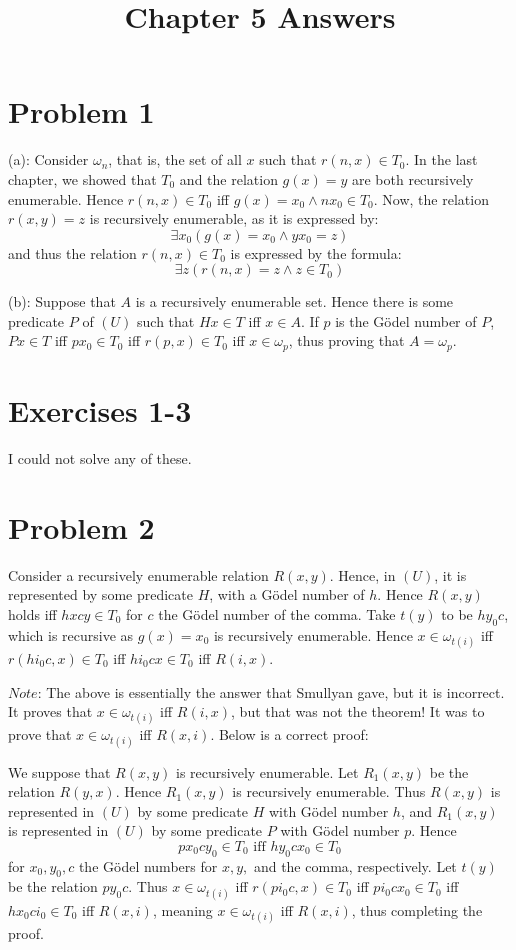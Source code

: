 \documentclass{article}
\title{Chapter 5 Answers}
\theoremstyle{definition}
\begin{document}
\date{}
\maketitle

\section*{Problem 1}
(a): Consider $\omega_n$, that is, the set of all $x$ such that $r\left(n,x\right)\in T_0$. In the last chapter, we showed that $T_0$ and the relation 
$g\left(x\right)=y$ are both recursively enumerable. Hence $r\left(n,x\right)\in T_0$ iff $g\left(x\right)=x_0\wedge nx_0\in T_0$. Now, the relation 
$r\left(x,y\right)=z$ is recursively enumerable, as it is expressed by: \[ \exists x_0\left(g\left(x\right)=x_0\wedge yx_0=z\right) \]
and thus the relation $r\left(n,x\right)\in T_0$ is expressed by the formula: \[ \exists z\left(r\left(n,x\right)=z\wedge z\in T_0\right) \]


(b): Suppose that $A$ is a recursively enumerable set. Hence there is some predicate $P$ of $\left(U\right)$ such that $Hx\in T$ iff $x\in A$. If $p$ is the Gödel number of 
$P$, $Px\in T$ iff $px_0\in T_0$ iff $r\left(p,x\right)\in T_0$ iff $x\in\omega_p$, thus proving that $A=\omega_p$.

\section*{Exercises 1-3}
I could not solve any of these.

\section*{Problem 2}
Consider a recursively enumerable relation $R\left(x,y\right)$. Hence, in $\left(U\right)$, it is represented by some predicate $H$, with a Gödel number of $h$. 
Hence $R(x,y)$ holds iff $hxcy\in T_0$ for $c$ the Gödel number of the comma. Take $t(y)$ to be $hy_0c$, which is recursive as $g(x)=x_0$ is recursively enumerable. 
Hence $x\in\omega_{t(i)}$ iff $r\left(hi_0c,x\right)\in T_0$ iff $hi_0cx\in T_0$ iff $R\left(i,x\right)$.


$Note$: The above is essentially the answer that Smullyan gave, but it is incorrect. It proves that $x\in\omega_{t(i)}$ iff $R(i,x)$, but that was not the theorem! It was 
to prove that $x\in\omega_{t(i)}$ iff $R(x,i)$. Below is a correct proof:


We suppose that $R(x,y)$ is recursively enumerable. Let $R_1(x,y)$ be the relation $R(y,x)$. Hence $R_1(x,y)$ is recursively enumerable. Thus 
$R(x,y)$ is represented in $(U)$ by some predicate $H$ with Gödel number $h$, and $R_1(x,y)$ is represented in $(U)$ by some predicate $P$ with Gödel number $p$. Hence 
\[ px_0cy_0\in T_0\textrm{ iff } hy_0cx_0\in T_0 \] for $x_0,y_0,c$ the Gödel numbers for $x,y,$ and the comma, respectively. Let $t(y)$ be the relation 
$py_0c$. Thus $x\in\omega_{t(i)}$ iff $r(pi_0c,x)\in T_0$ iff $pi_0cx_0\in T_0$ iff $hx_0ci_0\in T_0$ iff $R(x,i)$, meaning 
$x\in\omega_{t(i)}$ iff $R(x,i)$, thus completing the proof.
\end{document}
